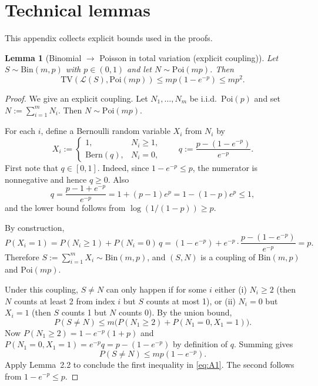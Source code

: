 \documentclass{article}
\newtheorem{lemma}[theorem]{Lemma}
\begin{document}
\appendix

\section{Technical lemmas}

This appendix collects explicit bounds used in the proofs.

\begin{lemma}[Binomial $\to$ Poisson in total variation (explicit coupling)]
Let $S \sim \mathrm{Bin}(m, p)$ with $p \in (0,1)$ and let $N \sim \mathrm{Poi}(mp)$. Then
\begin{equation}
\mathrm{TV}(\mathcal{L}(S), \mathrm{Poi}(mp)) \leq mp(1 - e^{-p}) \leq mp^2. \label{eq:A1}
\end{equation}
\end{lemma}

\begin{proof}
We give an explicit coupling. Let $N_1, \ldots, N_m$ be i.i.d.\ $\mathrm{Poi}(p)$ and set $N := \sum_{i=1}^m N_i$.
Then $N \sim \mathrm{Poi}(mp)$.

For each $i$, define a Bernoulli random variable $X_i$ from $N_i$ by
\[
X_i := \begin{cases} 1, & N_i \geq 1, \\ \mathrm{Bern}(q), & N_i = 0, \end{cases} \qquad q := \frac{p - (1 - e^{-p})}{e^{-p}}.
\]
First note that $q \in [0,1]$. Indeed, since $1 - e^{-p} \leq p$, the numerator is nonnegative and hence $q \geq 0$.
Also
\[
q = \frac{p - 1 + e^{-p}}{e^{-p}} = 1 + (p-1)e^p = 1 - (1-p)e^p \leq 1,
\]
and the lower bound follows from $\log(1/(1-p)) \geq p$.

By construction,
\[
P(X_i = 1) = P(N_i \geq 1) + P(N_i = 0)\, q = (1 - e^{-p}) + e^{-p} \cdot \frac{p - (1 - e^{-p})}{e^{-p}} = p.
\]
Therefore $S := \sum_{i=1}^m X_i \sim \mathrm{Bin}(m,p)$, and $(S, N)$ is a coupling of $\mathrm{Bin}(m,p)$ and $\mathrm{Poi}(mp)$.

Under this coupling, $S \neq N$ can only happen if for some $i$ either (i) $N_i \geq 2$ (then $N$ counts at
least 2 from index $i$ but $S$ counts at most 1), or (ii) $N_i = 0$ but $X_i = 1$ (then $S$ counts 1 but $N$
counts 0). By the union bound,
\[
P(S \neq N) \leq m\bigl(P(N_1 \geq 2) + P(N_1 = 0, X_1 = 1)\bigr).
\]
Now $P(N_1 \geq 2) = 1 - e^{-p}(1 + p)$ and $P(N_1 = 0, X_1 = 1) = e^{-p} q = p - (1 - e^{-p})$ by definition of $q$.
Summing gives
\[
P(S \neq N) \leq mp(1 - e^{-p}).
\]
Apply Lemma~2.2 to conclude the first inequality in \eqref{eq:A1}. The second follows from $1 - e^{-p} \leq p$.
\end{proof}
\end{document}
